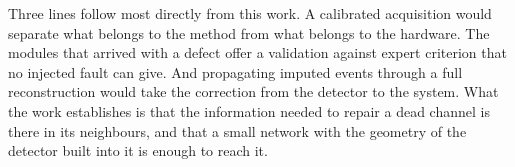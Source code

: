 \documentclass[10pt,conference]{IEEEtran}
\begin{document}
Three lines follow most directly from this work. A calibrated acquisition would
separate what belongs to the method from what belongs to the hardware. The
modules that arrived with a defect offer a validation against expert criterion
that no injected fault can give. And propagating imputed events through a full
reconstruction would take the correction from the detector to the system. What
the work establishes is that the information
needed to repair a dead channel is there in its neighbours, and that a small
network with the geometry of the detector built into it is enough to reach it.




\end{document}
